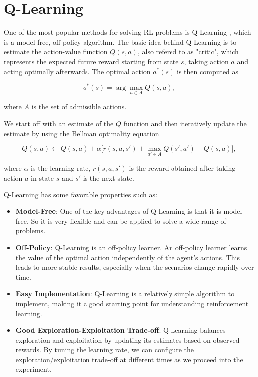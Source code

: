 \section{Q-Learning}
One of the most popular methods for solving RL problems is Q-Learning \cite{watkins1992q}, which is a model-free, off-policy algorithm. 
The basic idea behind Q-Learning is to estimate the action-value function $Q(s,a)$, also refered to as "critic", which represents the expected future reward starting from state $s$, taking action $a$ and acting optimally afterwards. The optimal action $a^*(s)$ is then computed as

\begin{equation}
a^*(s) = \arg \max_{a \in A} Q(s,a),
\end{equation}

where $A$ is the set of admissible actions.

We start off with an estimate of the $Q$ function and then iteratively update the estimate by using the Bellman optimality equation \parencite{bellman1957dynamic}


\begin{equation}
Q(s,a) \leftarrow Q(s,a) + \alpha \big[r(s,a,s') +  \max_{a' \in A} Q(s',a') - Q(s,a)\big],
\end{equation}

where $\alpha$ is the learning rate, $r(s,a,s')$ is the reward obtained after taking action $a$ in state $s$ and $s'$ is the next state.

Q-Learning has some favorable properties \cite{sutton2018reinforcement} such as:

\begin{itemize}
    \item 
    \textbf{Model-Free}: One of the key advantages of Q-Learning is that it is model free. So it is very flexible and can be applied to solve a wide range of problems.
    \item
\textbf{Off-Policy}: Q-Learning is an off-policy learner. An off-policy learner learns the value of the optimal action independently of the agent's actions. This leads to more stable results, especially when the scenarios change rapidly over time.
    \item
\textbf{Easy Implementation}: Q-Learning is a relatively simple algorithm to implement, making it a good starting point for understanding reinforcement learning.
    \item

\textbf{Good Exploration-Exploitation Trade-off}: Q-Learning balances exploration and exploitation by updating its estimates based on observed rewards. By tuning the learning rate, we can configure the exploration/exploitation trade-off at different times as we proceed into the experiment.

\end{itemize}


